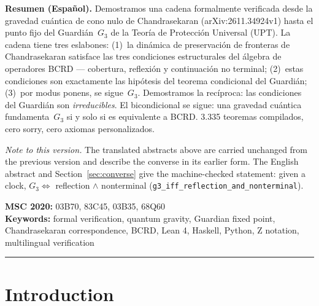 \documentclass[11pt,a4paper]{article}
\theoremstyle{definition}
\theoremstyle{remark}
\begin{document}
\begin{center}
\parbox{0.85\textwidth}{\small\textbf{Resumen (Espa\~{n}ol).}
Demostramos una cadena formalmente verificada desde la gravedad cu\'{a}ntica de cono nulo de Chandrasekaran (arXiv:2611.34924v1) hasta el punto fijo del Guardi\'{a}n~$G_3$ de la Teor\'{i}a de Protecci\'{o}n Universal (UPT). La cadena tiene tres eslabones: (1)~la din\'{a}mica de preservaci\'{o}n de fronteras de Chandrasekaran satisface las tres condiciones estructurales del \'{a}lgebra de operadores BCRD --- cobertura, reflexi\'{o}n y continuaci\'{o}n no terminal; (2)~estas condiciones son exactamente las hip\'{o}tesis del teorema condicional del Guardi\'{a}n; (3)~por modus ponens, se sigue~$G_3$. Demostramos la rec\'{i}proca: las condiciones del Guardi\'{a}n son \emph{irreducibles}. El bicondicional se sigue: una gravedad cu\'{a}ntica fundamenta~$G_3$ si y solo si es equivalente a BCRD. 3.335 teoremas compilados, cero sorry, cero axiomas personalizados.}
\end{center}

\begin{center}
\parbox{0.85\textwidth}{\small\emph{Note to this version.} The translated abstracts above are carried unchanged from the previous version and describe the converse in its earlier form. The English abstract and Section~\ref{sec:converse} give the machine-checked statement: given a clock, $G_3 \Leftrightarrow$ reflection $\wedge$ nonterminal (\texttt{g3\_iff\_reflection\_and\_nonterminal}).}
\end{center}

\medskip

\noindent\textbf{MSC 2020:} 03B70, 83C45, 03B35, 68Q60\\
\textbf{Keywords:} formal verification, quantum gravity, Guardian fixed point, Chandrasekaran correspondence, BCRD, Lean 4, Haskell, Python, Z notation, multilingual verification

\bigskip\hrule\bigskip

\tableofcontents

\bigskip

\section{Introduction}
\end{document}
